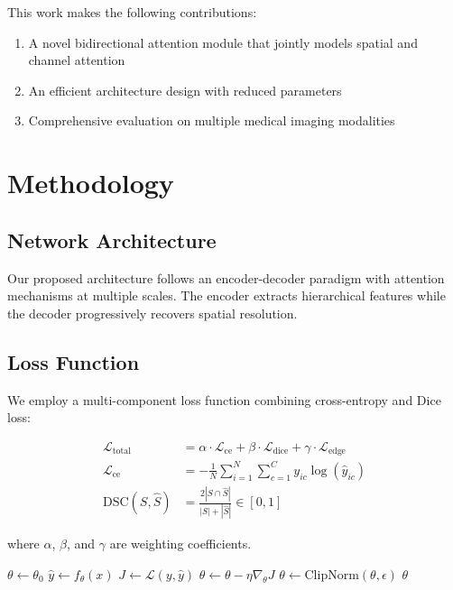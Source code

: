 \documentclass[journal,12pt]{IEEEtran}
\begin{document}
This work makes the following contributions:
\begin{enumerate}
  \item A novel bidirectional attention module that jointly models spatial and
        channel attention
  \item An efficient architecture design with reduced parameters
  \item Comprehensive evaluation on multiple medical imaging modalities
\end{enumerate}

\section{Methodology}
\label{sec:method}

\subsection{Network Architecture}
\label{ssec:arch}

Our proposed architecture follows an encoder-decoder paradigm with attention
mechanisms at multiple scales. The encoder extracts hierarchical features while
the decoder progressively recovers spatial resolution.

\subsection{Loss Function}
\label{ssec:loss}

We employ a multi-component loss function combining cross-entropy and Dice loss:

\begin{align}
  \mathcal{L}_{\text{total}}
    &= \alpha \cdot \mathcal{L}_{\text{ce}}
       + \beta  \cdot \mathcal{L}_{\text{dice}}
       + \gamma \cdot \mathcal{L}_{\text{edge}} \label{eq:loss} \\
  \mathcal{L}_{\text{ce}}
    &= -\frac{1}{N}\sum_{i=1}^{N}
       \sum_{c=1}^{C} y_{ic}\log(\hat{y}_{ic}) \label{eq:ce} \\
  \text{DSC}(S,\hat{S})
    &= \frac{2|S\cap\hat{S}|}{|S|+|\hat{S}|}
       \in [0,1] \label{eq:dsc}
\end{align}

where $\alpha$, $\beta$, and $\gamma$ are weighting coefficients.

\begin{algorithm}[t]
  \caption{Training Procedure with Attention}
  \begin{algorithmic}[1]
    \State $\theta \gets \theta_0$ 
        \State $\hat{y} \gets f_\theta(x)$ 
        \State $J \gets \mathcal{L}(y,\hat{y})$ 
        \State $\theta \gets \theta - \eta \nabla_\theta J$ 
      \EndFor
        \State $\theta \gets \text{ClipNorm}(\theta, \epsilon)$ 
      \EndIf
    \EndFor
    \State \Return $\theta$
  \end{algorithmic}
\end{algorithm}
\end{document}
